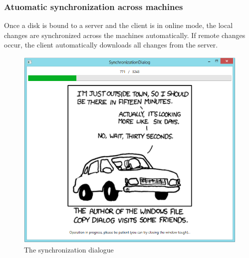 \documentclass[JCDReport.tex]{subfiles}
\begin{document}
\subsubsection{Atuomatic synchronization across machines}
Once a disk is bound to a server and the client is in online mode, the local changes are synchronized across the machines automatically. If remote changes occur, the client automatically downloads all changes from the server.
\begin{figure}[h!]
	\centering
	\includegraphics[scale=0.7]{Images/synchronization_dialog.png} 
	\caption{The synchronization dialogue}
\end{figure}

\end{document}

